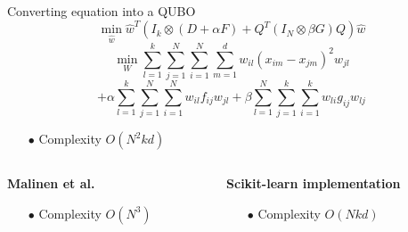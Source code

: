 	\begin{frame}{Converting equation into a QUBO}
		$$\min _{\hat{w}} \hat{w}^{T}\left(I_{k} \otimes(D+\alpha F)+Q^{T}\left(I_{N} \otimes \beta G\right) Q\right) \hat{w}$$
		\bigbreak
		$$
			\min _{W} \sum_{l=1}^k \sum_{j=1}^N \sum_{i=1}^N \sum_{m=1}^d w_{i l}\left(x_{i m}-x_{j m}\right)^{2} w_{jl}
		$$
		$$
			+\alpha \sum_{l=1}^{k} \sum_{j=1}^{N} \sum_{i=1}^{N} w_{il} f_{ij} w_{j l}+\beta \sum_{l=1}^{N} \sum_{j=1}^{k} \sum_{i=1}^{k} w_{li} g_{i j} w_{lj}
		$$
		\begin{itemize}
			\item[$\bullet$] Complexity $O(N^2 k d)$ 
		\end{itemize}
		\bigbreak
		\begin{columns}
			\begin{column}{0.5\textwidth}
				\textbf{Malinen et al.}
				\begin{itemize}
					\item[$\bullet$] Complexity $O(N^3)$ 
				\end{itemize}
			\end{column}
			\begin{column}{0.5\textwidth}  
				\textbf{Scikit-learn implementation}
				\begin{itemize}
					\item[$\bullet$] Complexity $O(Nkd)$ 
				\end{itemize}
			\end{column}
		\end{columns}

		\bigbreak		
	\end{frame}



